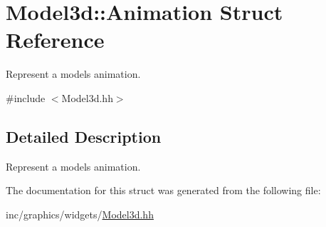 \hypertarget{structModel3d_1_1Animation}{}\section{Model3d\+:\+:Animation Struct Reference}
\label{structModel3d_1_1Animation}


Represent a model\textquotesingle{}s animation.  




{\ttfamily \#include $<$Model3d.\+hh$>$}



\subsection{Detailed Description}
Represent a model\textquotesingle{}s animation. 

The documentation for this struct was generated from the following file\+:\begin{DoxyCompactItemize}
\item 
inc/graphics/widgets/\hyperlink{Model3d_8hh}{Model3d.\+hh}\end{DoxyCompactItemize}
